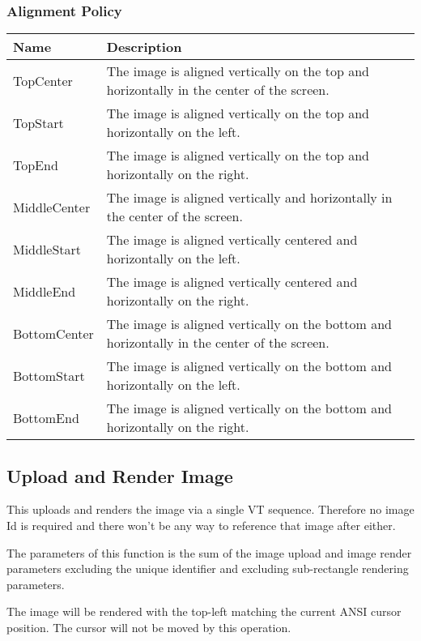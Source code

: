 \documentclass[a4paper]{article}
\begin{document}
\subsubsection*{Alignment Policy}

\begin{tabular}{ |l|l| }
    \hline
    \textbf{Name}          & \textbf{Description} \\
    \hline
    TopCenter     & The image is aligned vertically on the top and horizontally in the center of the screen. \\
    TopStart      & The image is aligned vertically on the top and horizontally on the left. \\
    TopEnd        & The image is aligned vertically on the top and horizontally on the right. \\
    \hline
    MiddleCenter  & The image is aligned vertically and horizontally in the center of the screen. \\
    MiddleStart   & The image is aligned vertically centered and horizontally on the left. \\
    MiddleEnd     & The image is aligned vertically centered and horizontally on the right. \\
    \hline
    BottomCenter  & The image is aligned vertically on the bottom and horizontally in the center of
    the screen. \\
    BottomStart   & The image is aligned vertically on the bottom and horizontally on the left. \\
    BottomEnd     & The image is aligned vertically on the bottom and horizontally on the right. \\
    \hline
\end{tabular}

\subsection{Upload and Render Image} %

This uploads and renders the image via a single VT sequence. Therefore no image Id
is required and there won't be any way to reference that image after either.

The parameters of this function is the sum of the image upload and image render parameters excluding the unique
identifier and excluding sub-rectangle rendering parameters.

The image will be rendered with the top-left matching the current ANSI cursor position.
The cursor will not be moved by this operation.
\end{document}
